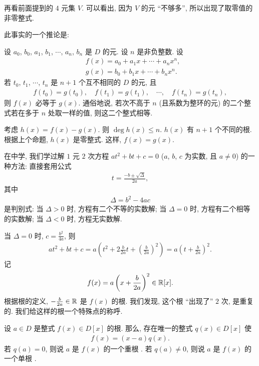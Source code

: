 \begin{remark}
    再看前面提到的 $4$ 元集 $V$. 可以看出, 因为 $V$ 的元 ``不够多'', 所以出现了取零值的非零整式.
\end{remark}

此事实的一个推论是:

\begin{proposition}
    设 $a_0$, $b_0$, $a_1$, $b_1$, $\cdots$, $a_n$, $b_n$ 是 $D$ 的元. 设 $n$ 是非负整数. 设
    \begin{align*}
         & f(x) = a_0 + a_1 x + \cdots + a_n x^n, \\
         & g(x) = b_0 + b_1 x + \cdots + b_n x^n.
    \end{align*}
    若 $t_0$, $t_1$, $\cdots$, $t_n$ 是 $n+1$ 个互不相同的 $D$ 的元, 且
    \begin{align*}
        f(t_0) = g(t_0), \quad f(t_1) = g(t_1), \quad \cdots, \quad f(t_n) = g(t_n),
    \end{align*}
    则 $f(x)$ 必等于 $g(x)$. 通俗地说, 若次不高于 $n$ (且系数为整环的元) 的二个整式若在多于 $n$ 处取一样的值, 则这二个整式相等.
\end{proposition}

\begin{pf}
    考虑 $h(x) = f(x) - g(x)$. 则 $\deg h(x) \leq n$. $h(x)$ 有 $n+1$ 个不同的根. 根据上个命题, $h(x)$ 是零整式. 这样, $f(x) = g(x)$.
\end{pf}

在中学, 我们学过解 $1$ 元 $2$ 次方程 $at^2 + bt + c = 0$ ($a$, $b$, $c$ 为实数, 且 $a \neq 0$) 的一种方法: 直接套用公式
\begin{align*}
    t = \frac{-b \pm \sqrt{\Delta}}{2a},
\end{align*}
其中
\begin{align*}
    \Delta = b^2 - 4ac
\end{align*}
是判别式: 当 $\Delta > 0$ 时, 方程有二个不等的实数解; 当 $\Delta = 0$ 时, 方程有二个相等的实数解; 当 $\Delta < 0$ 时, 方程无实数解.

当 $\Delta = 0$ 时, $c = \frac{b^2}{4a}$, 则
\begin{align*}
    at^2 + bt + c = a \left( t^2 + 2\frac{b}{2a}t + \left(\frac{b}{2a}\right)^2 \right) = a \left( t + \frac{b}{2a} \right)^2.
\end{align*}
记
$$
    f(x) = a \left( x + \frac{b}{2a} \right)^2 \in \mathbb{R}[x].
$$
根据根的定义, $-\frac{b}{2a} \in \mathbb{R}$ 是 $f(x)$ 的根. 我们发现, 这个根 ``出现了'' $2$ 次, 是重复的. 我们给这样的根一个特殊点的称呼.

\begin{definition}
    设 $a \in D$ 是整式 $f(x) \in D[x]$ 的根. 那么, 存在唯一的整式 $q(x) \in D[x]$ 使
    \begin{align*}
        f(x) = (x - a) q(x).
    \end{align*}
    若 $q(a) = 0$, 则说 $a$ 是 $f(x)$ 的一个重根 . 若 $q(a) \neq 0$, 则说 $a$ 是 $f(x)$ 的一个单根 .
\end{definition}

